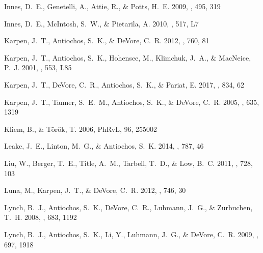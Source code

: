 \documentclass[twocolumn]{aastex6}
\newcommand{\prlet}{PhRvL}
\begin{document}
\begin{thebibliography}{}
{Innes}, D.~E., {Genetelli}, A., {Attie}, R., \& {Potts}, H.~E. 2009, \aap,
  495, 319

{Innes}, D.~E., {McIntosh}, S.~W., \& {Pietarila}, A. 2010, \aap, 517, L7

{Karpen}, J.~T., {Antiochos}, S.~K., \& {DeVore}, C.~R. 2012, \apj, 760, 81

{Karpen}, J.~T., {Antiochos}, S.~K., {Hohensee}, M., {Klimchuk}, J.~A., \&
  {MacNeice}, P.~J. 2001, \apjl, 553, L85

{Karpen}, J.~T., {DeVore}, C.~R., {Antiochos}, S.~K., \& {Pariat}, E. 2017,
  \apj, 834, 62

{Karpen}, J.~T., {Tanner}, S.~E.~M., {Antiochos}, S.~K., \& {DeVore}, C.~R.
  2005, \apj, 635, 1319

{Kliem}, B., \& {T{\"o}r{\"o}k}, T. 2006, \prlet, 96, 255002

{Leake}, J.~E., {Linton}, M.~G., \& {Antiochos}, S.~K. 2014, \apj, 787, 46

{Liu}, W., {Berger}, T.~E., {Title}, A.~M., {Tarbell}, T.~D., \& {Low}, B.~C.
  2011, \apj, 728, 103

{Luna}, M., {Karpen}, J.~T., \& {DeVore}, C.~R. 2012, \apj, 746, 30

{Lynch}, B.~J., {Antiochos}, S.~K., {DeVore}, C.~R., {Luhmann}, J.~G., \&
  {Zurbuchen}, T.~H. 2008, \apj, 683, 1192

{Lynch}, B.~J., {Antiochos}, S.~K., {Li}, Y., {Luhmann}, J.~G., \& {DeVore},
  C.~R. 2009, \apj, 697, 1918


\end{thebibliography}
\end{document}
